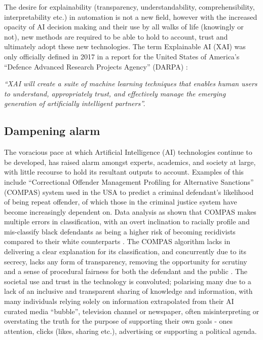 The desire for explainability (transparency, understandability, comprehensibility, interpretability etc.) in automation is not a new field, however with the increased opacity of AI decision making and their use by all walks of life (knowingly or not), new methods are required to be able to hold to account, trust and ultimately adopt these new technologies. The term Explainable AI (XAI) was only officially defined in 2017 in a report for the United States of America’s “Defence Advanced Research Projects Agency” (DARPA) \cite{gunningExplainableArtificialIntelligence2017}:

\emph{“XAI will create a suite of machine learning techniques that enables human users to understand, appropriately trust, and effectively manage the emerging generation of artificially intelligent partners”.}

\vspace{1cm}

\subsection{Dampening alarm}

The voracious pace at which Artificial Intelligence (AI) technologies continue to be developed, has raised alarm amongst experts, academics, and society at large, with little recourse to hold its resultant outputs to account. Examples of this include “Correctional Offender Management Profiling for Alternative Sanctions” (COMPAS) system used in the USA to predict a criminal defendant’s likelihood of being repeat offender, of which those in the criminal justice system have become increasingly dependent on. Data analysis as shown that COMPAS makes multiple errors in classification, with an overt inclination to racially profile and mis-classify black defendants as being a higher risk of becoming recidivists compared to their white counterparts \cite{larsonHowWeAnalyzed2016}. The COMPAS algorithm lacks in delivering a clear explanation for its classification, and concurrently due to its secrecy, lacks any form of transparency, removing the opportunity for scrutiny and a sense of procedural fairness for both the defendant and the public \cite{rudinAgeSecrecyUnfairness2020}. The societal use and trust in the technology is convoluted; polarising many due to a lack of an inclusive and transparent sharing of knowledge and information, with many individuals relying solely on information extrapolated from their AI curated media “bubble”, television channel or newspaper, often misinterpreting or overstating the truth for the purpose of supporting their own goals - ones attention, clicks (likes, sharing etc.), advertising or supporting a political agenda.

